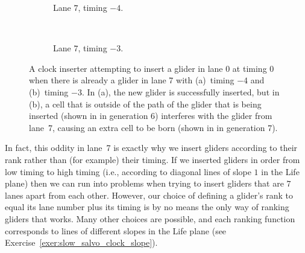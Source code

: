 \begin{figure}[!ht]
	\centering
	\begin{subfigure}{.48\textwidth}
		\centering{}
		\caption{Lane $7$, timing $-4$.}\label{fig:clock_inserter_7_lanes_ok}
	\end{subfigure} \ \ \ \ %
	\begin{subfigure}{.48\textwidth}
		\centering{}
		\caption{Lane $7$, timing $-3$.}\label{fig:clock_inserter_7_lanes_bad}
	\end{subfigure}
	\caption{A clock inserter attempting to insert a glider in lane $0$ at timing $0$ when there is already a glider in lane 7 with (a)~timing $-4$ and (b)~timing $-3$. In (a), the new glider is successfully inserted, but in (b), a cell that is outside of the path of the glider that is being inserted (shown in  in generation 6) interferes with the glider from lane~7, causing an extra cell to be born (shown in  in generation 7).}\label{fig:clock_inserter_7_lanes}
\end{figure}

In fact, this oddity in lane~7 is exactly why we insert gliders according to their rank rather than (for example) their timing. If we inserted gliders in order from low timing to high timing (i.e., according to diagonal lines of slope $1$ in the Life plane) then we can run into problems when trying to insert gliders that are $7$ lanes apart from each other. However, our choice of defining a glider's rank to equal its lane number plus its timing is by no means the only way of ranking gliders that works. Many other choices are possible, and each ranking function corresponds to lines of different slopes in the Life plane (see Exercise~\ref{exer:slow_salvo_clock_slope}).